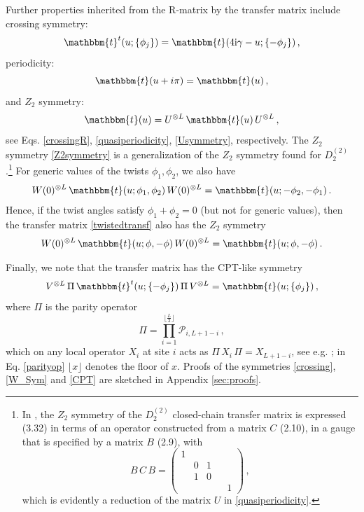 \documentclass[12pt]{article}
\numberwithin{equation}{section}
\newcommand{\ri}{{\rm i}}
\begin{document}
Further properties inherited from the R-matrix
by the transfer matrix include crossing symmetry:
\begin{equation}
     \mathbbm{t}^t(u; \{\phi_j\}) = \mathbbm{t}(4\ri \gamma-u; \{-\phi_j\}) \,,
     \label{crossing}
\end{equation}
periodicity:
\begin{equation}
     \mathbbm{t}(u+i\pi) = \mathbbm{t}(u) \,,
     \label{periodicity}
\end{equation}
and $Z_2$ symmetry:
\begin{equation}
    \mathbbm{t}(u) = U^{\otimes L}\, \mathbbm{t}(u)\, U^{\otimes L} \,,
    \label{Z2symmetry}
\end{equation}
see Eqs. \eqref{crossingR}, \eqref{quasiperiodicity}, \eqref{Usymmetry},   
respectively. The $Z_2$ symmetry \eqref{Z2symmetry} is a 
generalization of the $Z_2$ symmetry found for $D^{(2)}_2$ \cite{IkJS08,RPJS20, NeRe21a}.\footnote{In \cite{NeRe21a}, the $Z_2$ symmetry of the $D^{(2)}_2$ closed-chain transfer matrix is expressed (3.32) in terms of an operator constructed from a matrix $C$ (2.10), in a gauge that is specified by a matrix $B$ (2.9), with
\begin{equation*}
    B\, C\, B = \left(\begin{smallmatrix}
     1 & & & \\
     & 0 & 1 & \\
     & 1 & 0 & \\
     & & & & 1 
    \end{smallmatrix}\right) \,,
\end{equation*}
which is evidently a reduction of the matrix $U$ in \eqref{quasiperiodicity}.} For generic values of the twists $\phi_1, \phi_2$, we also have 
\begin{align}
    W(0)^{\otimes L}\, \mathbbm{t}(u; \phi_1, \phi_2)\, W(0)^{\otimes L}=\mathbbm{t}(u; -\phi_2, -\phi_1) \,.
    \label{W_Sym}
\end{align}
Hence, if the twist angles satisfy $\phi_1 + \phi_2 =0$ (but not for generic values), then the transfer matrix \eqref{twistedtransf} also has the $Z_2$ symmetry 
\begin{align}
    W(0)^{\otimes L}\, \mathbbm{t}(u; \phi, -\phi)\, W(0)^{\otimes L}=\mathbbm{t}(u; \phi, -\phi) \,.
    \label{W_Sym2}
\end{align}


Finally, we note that the transfer matrix has the CPT-like symmetry
\begin{equation}
 V^{\otimes L}\,   \Pi\, \mathbbm{t}^t(u; \{-\phi_j\})\, \Pi\, V^{\otimes L} = \mathbbm{t}(u; \{\phi_j\}) \,,
 \label{CPT}
\end{equation}
where $\Pi$ is the parity operator
\begin{equation}
    \Pi = \prod_{i=1}^{\lfloor\frac{L}{2}\rfloor} \mathcal{P}_{i,L+1-i} \,,
    \label{parityop}
\end{equation}
which on any local operator $X_i$ at site $i$ acts as $\Pi\, X_i\, \Pi = X_{L+1-i}$, see e.g. \cite{DoNe98}; in Eq. \eqref{parityop} $\lfloor x \rfloor$ denotes the floor of $x$.
Proofs of the symmetries \eqref{crossing}, \eqref{W_Sym} and \eqref{CPT} are sketched in Appendix \ref{sec:proofs}.
\end{document}
